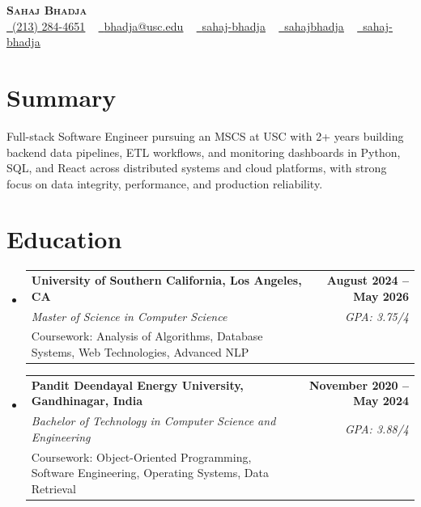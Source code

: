 \documentclass[letterpaper,10pt]{article}
\makeatletter
\newcommand{\resumeEduSubheading}[5]{\vspace{-1pt}\item\begin{tabular*}{1.0\textwidth}[t]{l@{\extracolsep{\fill}}r}\textbf{#1} & \textbf{\small #2} \\\textit{\small #3} & \textit{\small #4} \\\small #5 & \\\end{tabular*}\vspace{-4pt}}
\newcommand{\resumeSubHeadingListStart}{\begin{itemize}[leftmargin=0.0in, label={}]}
\newcommand{\resumeSubHeadingListEnd}{\end{itemize}}
\makeatother
\begin{document}
\begin{center}
{\Huge \scshape \textbf{Sahaj Bhadja}} \\ \vspace{1pt}
\small \href{tel:(213) 284-4651}{\faPhone\ \underline{(213) 284-4651}} ~ \href{mailto: bhadja@usc.edu}{\raisebox{-0.2\height}\faEnvelope\ \underline{bhadja@usc.edu}} ~
\href{https://www.linkedin.com/in/sahaj-bhadja/}{\raisebox{-0.2\height}\faLinkedin\ \underline{sahaj-bhadja}} ~ \href{https://github.com/SAHAJ-BHADJA}{\raisebox{-0.2\height}\faGithub\ \underline{sahajbhadja}} ~
\href{https://sahaj-bhadja.vercel.app/}{\raisebox{-0.2\height}\faGlobe\ \underline{sahaj-bhadja}}
\end{center}
\vspace{-16pt}
\section{Summary}
\begin{itemize}[leftmargin=0.15in, label={}]
\small{\item{Full-stack Software Engineer pursuing an MSCS at USC with 2+ years building backend data pipelines, ETL workflows, and monitoring dashboards in Python, SQL, and React across distributed systems and cloud platforms, with strong focus on data integrity, performance, and production reliability.}}
\end{itemize}
\vspace{-6pt}
\section{Education}
\resumeSubHeadingListStart
\resumeEduSubheading{University of Southern California, Los Angeles, CA}{August 2024 -- May 2026}{Master of Science in Computer Science}{GPA: 3.75/4}{Coursework: Analysis of Algorithms, Database Systems, Web Technologies, Advanced NLP}
\vspace{-9pt}
\resumeEduSubheading{Pandit Deendayal Energy University, Gandhinagar, India}{November 2020 -- May 2024}{Bachelor of Technology in Computer Science and Engineering}{GPA: 3.88/4}{Coursework: Object-Oriented Programming, Software Engineering, Operating Systems, Data Retrieval}
\resumeSubHeadingListEnd
\vspace{-6pt}
\end{document}
